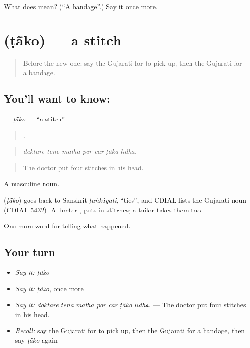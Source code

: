 \begin{tcolorbox}[breakable,colback=teal!4,colframe=teal!35!black,title={Before you move on}]
What does  mean? (\textquotedblleft{}A bandage\textquotedblright{}.) Say it once more.
\end{tcolorbox}
\section[\texorpdfstring{\gu{ટાંકો} (ṭā̃ko)}{ટાંકો (ṭā̃ko)}]{ (ṭā̃ko) — a stitch}

\label{lesson:GU-C296-tako}



\begin{quote}
Before the new one: say the Gujarati for to pick up, then the Gujarati for a bandage.
\end{quote}

\subsection*{You'll want to know: }
\textbf{} — \emph{ṭā̃ko} — \textquotedblleft{}a stitch\textquotedblright{}.

\begin{quote}
      .
\end{quote}

\begin{quote}
\emph{dāktare tenā māthā par cār ṭā̃kā līdhā.}
\end{quote}

\begin{quote}
The doctor put four stitches in his head.
\end{quote}

A masculine noun.

\begin{cousinweb}
\textbf{} (\emph{ṭā̃ko}) goes back to Sanskrit \emph{ṭaṅkáyati}, \textquotedblleft{}ties\textquotedblright{}, and CDIAL lists the Gujarati noun (CDIAL 5432). A doctor \textbf{  }, puts in stitches; a tailor takes them too.
\end{cousinweb}

\begin{grammarlens}[title={What you've built}]
One more word for telling what happened.
\end{grammarlens}

\subsection*{Your turn}
\begin{itemize}
\raggedright
  \item \emph{Say it:} \emph{ṭā̃ko}
  \item \emph{Say it:} \emph{ṭā̃ko}, once more
  \item \emph{Say it:} \emph{dāktare tenā māthā par cār ṭā̃kā līdhā.} — The doctor put four stitches in his head.
  \item \emph{Recall:} say the Gujarati for to pick up, then the Gujarati for a bandage, then say \emph{ṭā̃ko} again
\end{itemize}

